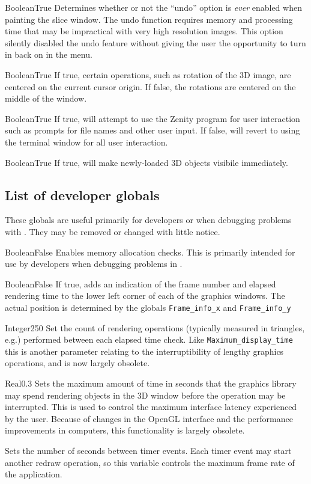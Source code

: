{Boolean}{True}
{Determines whether or not the ``undo'' option is {\em ever} enabled when painting the slice window. The undo function requires memory and processing time that may be impractical with very high resolution images. This option silently disabled the undo feature without giving the user the opportunity to turn in back on in the menu.}{}

{Boolean}{True}
{If true, certain operations, such as rotation of the 3D image, are centered on the current cursor origin. If false, the rotations are centered on the middle of the window.}{}

{Boolean}{True}
{If true, \display{} will attempt to use the Zenity program for user interaction
such as prompts for file names and other user input. If false, 
\display{} will revert to using the terminal window for all user interaction.}{}

{Boolean}{True}
{If true, \display{} will make newly-loaded 3D objects visibile immediately.}{}

\subsection{List of developer globals}
These globals are useful primarily for developers or when debugging problems
with \display. They may be removed or changed with little notice.

{Boolean}{False}
{Enables memory allocation checks. This is primarily intended for use by developers when debugging problems in \display.}{}

{Boolean}{False}
{If true, adds an indication of the frame number and elapsed rendering time to the lower left corner of each of the graphics windows. The actual position is determined by the globals {\tt Frame\_info\_x} and {\tt Frame\_info\_y}}{}

 {Integer}{250}
{Set the count of rendering operations (typically measured in triangles, e.g.) performed between each elapsed time check. Like {\tt Maximum\_display\_time} this is another parameter relating to the interruptibility of lengthy graphics operations, and is now largely obsolete.}{}

 {Real}{0.3} 
{Sets the maximum amount of time in seconds that the graphics library may 
spend rendering objects in the 3D window before the operation may be 
interrupted. This is used to control the maximum interface latency 
experienced by the user. Because of changes in the OpenGL interface and the
performance improvements in computers, this functionality is largely obsolete.}{}

{Sets the number of seconds between timer events. Each timer event may
start another redraw operation, so this variable controls the maximum
frame rate of the application.}{}

